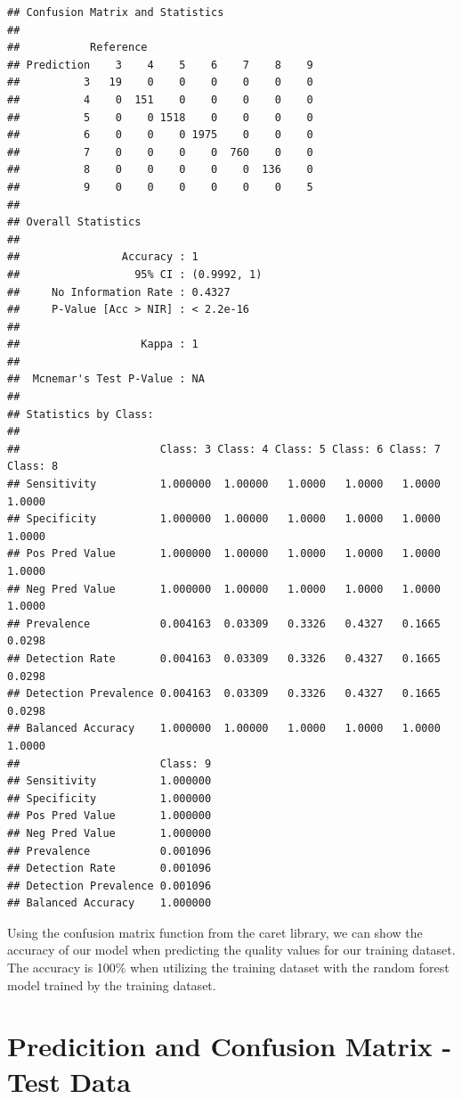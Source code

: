 \documentclass[
]{book}
\begin{document}
\begin{verbatim}
## Confusion Matrix and Statistics
## 
##           Reference
## Prediction    3    4    5    6    7    8    9
##          3   19    0    0    0    0    0    0
##          4    0  151    0    0    0    0    0
##          5    0    0 1518    0    0    0    0
##          6    0    0    0 1975    0    0    0
##          7    0    0    0    0  760    0    0
##          8    0    0    0    0    0  136    0
##          9    0    0    0    0    0    0    5
## 
## Overall Statistics
##                                      
##                Accuracy : 1          
##                  95% CI : (0.9992, 1)
##     No Information Rate : 0.4327     
##     P-Value [Acc > NIR] : < 2.2e-16  
##                                      
##                   Kappa : 1          
##                                      
##  Mcnemar's Test P-Value : NA         
## 
## Statistics by Class:
## 
##                      Class: 3 Class: 4 Class: 5 Class: 6 Class: 7 Class: 8
## Sensitivity          1.000000  1.00000   1.0000   1.0000   1.0000   1.0000
## Specificity          1.000000  1.00000   1.0000   1.0000   1.0000   1.0000
## Pos Pred Value       1.000000  1.00000   1.0000   1.0000   1.0000   1.0000
## Neg Pred Value       1.000000  1.00000   1.0000   1.0000   1.0000   1.0000
## Prevalence           0.004163  0.03309   0.3326   0.4327   0.1665   0.0298
## Detection Rate       0.004163  0.03309   0.3326   0.4327   0.1665   0.0298
## Detection Prevalence 0.004163  0.03309   0.3326   0.4327   0.1665   0.0298
## Balanced Accuracy    1.000000  1.00000   1.0000   1.0000   1.0000   1.0000
##                      Class: 9
## Sensitivity          1.000000
## Specificity          1.000000
## Pos Pred Value       1.000000
## Neg Pred Value       1.000000
## Prevalence           0.001096
## Detection Rate       0.001096
## Detection Prevalence 0.001096
## Balanced Accuracy    1.000000
\end{verbatim}

Using the confusion matrix function from the caret library, we can show the accuracy of our model when predicting the quality values for our training dataset. The accuracy is 100\% when utilizing the training dataset with the random forest model trained by the training dataset.

\hypertarget{predicition-and-confusion-matrix---test-data}{%
\section{Predicition and Confusion Matrix - Test Data}\label{predicition-and-confusion-matrix---test-data}}
\end{document}
